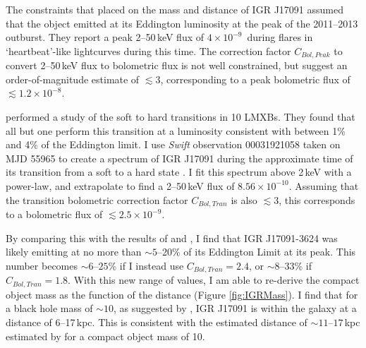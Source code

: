 \par The constraints that \citealp{Altamirano_IGR_FH} placed on the mass and distance of IGR J17091 assumed that the object emitted at its Eddington luminosity at the peak of the 2011--2013 outburst.  They report a peak 2--50\,keV flux of $4\times10^{-9}$\ergf\ during flares in `heartbeat'-like lightcurves during this time.  The correction factor $C_{Bol,Peak}$ to convert 2--50\,keV flux to bolometric flux is not well constrained, but \citealp{Altamirano_IGR_FH} suggest an order-of-magnitude estimate of $\lesssim3$, corresponding to a peak bolometric flux of $\lesssim1.2\times10^{-8}$\ergf .
\par \citealp{Maccarone_2pct} performed a study of the soft to hard transitions in 10 LMXBs.  They found that all but one perform this transition at a luminosity consistent with between 1\% and 4\% of the Eddington limit.  I use \textit{Swift} observation 00031921058 taken on MJD 55965 to create a spectrum of IGR J17091 during the approximate time of its transition from a soft to a hard state \citep{Drave_Return}.  I fit this spectrum above 2\,keV with a power-law, and extrapolate to find a 2--50\,keV flux of $8.56\times10^{-10}$\ergf .  Assuming that the transition bolometric correction factor $C_{Bol,Tran}$ is also $\lesssim3$, this corresponds to a bolometric flux of $\lesssim2.5\times10^{-9}$\ergf .
\par By comparing this with the results of \citealp{Maccarone_2pct} and \citealp{Altamirano_IGR_FH}, I find that IGR J17091-3624 was likely emitting at no more than $\sim5$--20\% of its Eddington Limit at its peak.  This number becomes $\sim6\mbox{--}25$\% if I instead use $C_{Bol,Tran}=2.4$, or $\sim8\mbox{--}33$\% if $C_{Bol,Tran}=1.8$.  With this new range of values, I am able to re-derive the compact object mass as the function of the distance (Figure \ref{fig:IGRMass}).  I find that for a black hole mass of $\sim10$\ms , as suggested by \citealp{Iyer_Bayes}, IGR J17091 is within the galaxy at a distance of 6--17\,kpc.  This is consistent with the estimated distance of $\sim11\mbox{--}17$\,kpc estimated by \citealp{Rodriguez_D} for a compact object mass of 10\ms .

